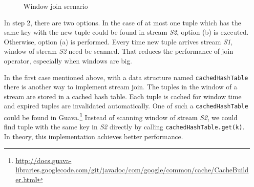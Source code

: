 \begin{figure}
  \begin{center}
   \caption{Window join scenario}
   \label{fig:window_join}
  \end{center}
\end{figure}

In step 2, there are two options. In the case of at most one tuple which has the same key with the new tuple could be found in stream \textit{S2}, option (b) is executed. Otherwise, option (a) is performed. Every time new tuple arrives stream \textit{S1}, window of stream \textit{S2} need be scanned. That reduces the performance of join operator, especially when windows are big.

In the first case mentioned above, with a data structure named \texttt{cachedHashTable} there is another way to implement stream join. The tuples in the window of a stream are stored in a cached hash table. Each tuple is cached for window time and expired tuples are invalidated automatically. One of such a \texttt{cachedHashTable} could be found in Guava.\footnote{\url{http://docs.guava-libraries.googlecode.com/git/javadoc/com/google/common/cache/CacheBuilder.html}} Instead of scanning window of stream \textit{S2}, we could find tuple with the same key in \textit{S2} directly by calling \texttt{cachedHashTable.get(k)}. In theory, this implementation achieves better performance. 

